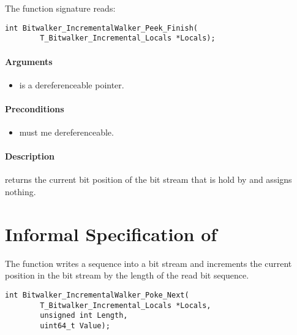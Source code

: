  The function signature reads:\\[1em]

\begin{lstlisting}[style=acsl-block]
int Bitwalker_IncrementalWalker_Peek_Finish(
        T_Bitwalker_Incremental_Locals *Locals);
\end{lstlisting}

\paragraph{Arguments}

\begin{itemize}
   \item  {} is a dereferenceable pointer.
\end{itemize}

\paragraph{Preconditions}
\begin{itemize}
   \item  {} must me dereferenceable.
\end{itemize}

\paragraph{Description}

\peekfinish  returns the current bit position of the bit stream that is hold by  and assigns nothing.


\clearpage

\section{Informal Specification of }

The function \pokenext writes a sequence into a bit stream 
and increments the current position in the bit stream by the 
length of the read bit sequence.\\[1em]


\begin{lstlisting}[style=acsl-block]
int Bitwalker_IncrementalWalker_Poke_Next(
        T_Bitwalker_Incremental_Locals *Locals,
        unsigned int Length,
        uint64_t Value);
\end{lstlisting}

